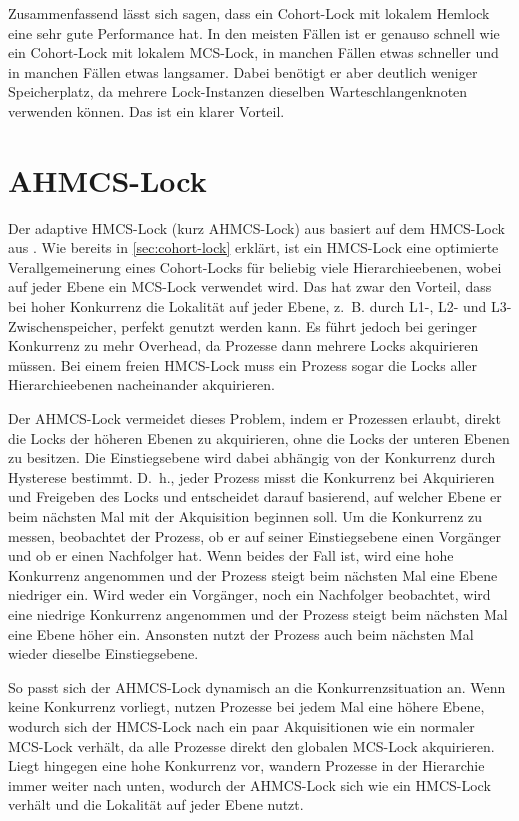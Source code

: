 Zusammenfassend lässt sich sagen,
dass ein Cohort-Lock mit lokalem Hemlock eine sehr gute Performance hat.
In den meisten Fällen ist er genauso schnell
wie ein Cohort-Lock mit lokalem MCS-Lock,
in manchen Fällen etwas schneller
und in manchen Fällen etwas langsamer.
Dabei benötigt er aber deutlich weniger Speicherplatz,
da mehrere Lock-Instanzen dieselben Warteschlangenknoten verwenden können.
Das ist ein klarer Vorteil.

\section{AHMCS-Lock}
\label{sec:ahmcs-lock}

Der adaptive HMCS-Lock (kurz AHMCS-Lock) aus \cite{AHMCS-Lock} basiert auf dem HMCS-Lock aus \cite{HMCS-Lock}.
Wie bereits in \autoref{sec:cohort-lock} erklärt,
ist ein HMCS-Lock eine optimierte Verallgemeinerung eines Cohort-Locks für beliebig viele Hierarchieebenen,
wobei auf jeder Ebene ein MCS-Lock verwendet wird.
Das hat zwar den Vorteil,
dass bei hoher \gls{Konkurrenz} die Lokalität auf jeder Ebene,
z.~B. durch L1-, L2- und L3-\gls{Zwischenspeicher},
perfekt genutzt werden kann.
Es führt jedoch bei geringer \gls{Konkurrenz} zu mehr Overhead,
da Prozesse dann mehrere Locks akquirieren müssen.
Bei einem freien HMCS-Lock muss ein Prozess sogar die Locks aller Hierarchieebenen nacheinander akquirieren.

Der AHMCS-Lock vermeidet dieses Problem,
indem er Prozessen erlaubt,
direkt die Locks der höheren Ebenen zu akquirieren,
ohne die Locks der unteren Ebenen zu besitzen.
Die Einstiegsebene wird dabei abhängig von der \gls{Konkurrenz} durch Hysterese bestimmt.
D.~h., jeder Prozess misst die \gls{Konkurrenz} bei Akquirieren und Freigeben des Locks
und entscheidet darauf basierend,
auf welcher Ebene er beim nächsten Mal mit der Akquisition beginnen soll.
Um die \gls{Konkurrenz} zu messen,
beobachtet der Prozess,
ob er auf seiner Einstiegsebene einen Vorgänger
und ob er einen Nachfolger hat.
Wenn beides der Fall ist,
wird eine hohe \gls{Konkurrenz} angenommen
und der Prozess steigt beim nächsten Mal eine Ebene niedriger ein.
Wird weder ein Vorgänger,
noch ein Nachfolger beobachtet,
wird eine niedrige \gls{Konkurrenz} angenommen
und der Prozess steigt beim nächsten Mal eine Ebene höher ein.
Ansonsten nutzt der Prozess auch beim nächsten Mal wieder dieselbe Einstiegsebene.

So passt sich der AHMCS-Lock dynamisch an die Konkurrenzsituation an.
Wenn keine \gls{Konkurrenz} vorliegt,
nutzen Prozesse bei jedem Mal eine höhere Ebene,
wodurch sich der HMCS-Lock nach ein paar Akquisitionen wie ein normaler MCS-Lock verhält,
da alle Prozesse direkt den globalen MCS-Lock akquirieren.
Liegt hingegen eine hohe \gls{Konkurrenz} vor,
wandern Prozesse in der Hierarchie immer weiter nach unten,
wodurch der AHMCS-Lock sich wie ein HMCS-Lock verhält
und die Lokalität auf jeder Ebene nutzt.

